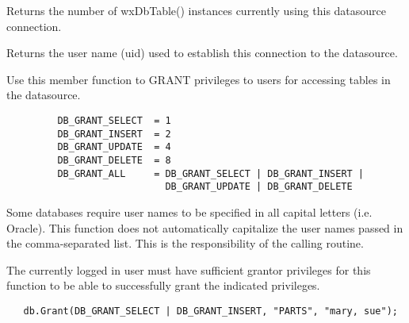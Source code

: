 Returns the number of wxDbTable() instances currently using this datasource
connection.


\label{wxdbgetusername}


Returns the user name (uid) used to establish this connection to the
datasource.


\label{wxdbgrant}


Use this member function to GRANT privileges to users for accessing tables in
the datasource.



\begin{verbatim}
         DB_GRANT_SELECT  = 1
         DB_GRANT_INSERT  = 2
         DB_GRANT_UPDATE  = 4
         DB_GRANT_DELETE  = 8
         DB_GRANT_ALL     = DB_GRANT_SELECT | DB_GRANT_INSERT |
                            DB_GRANT_UPDATE | DB_GRANT_DELETE
\end{verbatim}



Some databases require user names to be specified in all capital letters (i.e. Oracle).  This function does not automatically capitalize the user names passed in the comma-separated list.  This is the responsibility of the calling routine.

The currently logged in user must have sufficient grantor privileges for this
function to be able to successfully grant the indicated privileges.


\begin{verbatim}
   db.Grant(DB_GRANT_SELECT | DB_GRANT_INSERT, "PARTS", "mary, sue");
\end{verbatim}

